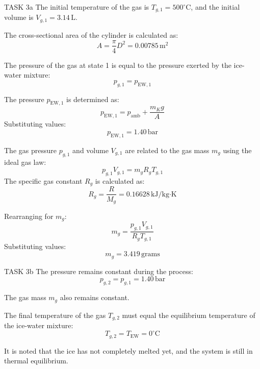 TASK 3a  
The initial temperature of the gas is \( T_{g,1} = 500^\circ\text{C} \), and the initial volume is \( V_{g,1} = 3.14 \, \text{L} \).  

The cross-sectional area of the cylinder is calculated as:  
\[
A = \frac{\pi}{4} D^2 = 0.00785 \, \text{m}^2
\]  

The pressure of the gas at state 1 is equal to the pressure exerted by the ice-water mixture:  
\[
p_{g,1} = p_{\text{EW},1}
\]  

The pressure \( p_{\text{EW},1} \) is determined as:  
\[
p_{\text{EW},1} = p_{\text{amb}} + \frac{m_K g}{A}
\]  
Substituting values:  
\[
p_{\text{EW},1} = 1.40 \, \text{bar}
\]  

The gas pressure \( p_{g,1} \) and volume \( V_{g,1} \) are related to the gas mass \( m_g \) using the ideal gas law:  
\[
p_{g,1} V_{g,1} = m_g R_g T_{g,1}
\]  
The specific gas constant \( R_g \) is calculated as:  
\[
R_g = \frac{R}{M_g} = 0.16628 \, \text{kJ/kg·K}
\]  

Rearranging for \( m_g \):  
\[
m_g = \frac{p_{g,1} V_{g,1}}{R_g T_{g,1}}
\]  
Substituting values:  
\[
m_g = 3.419 \, \text{grams}
\]  

TASK 3b  
The pressure remains constant during the process:  
\[
p_{g,2} = p_{g,1} = 1.40 \, \text{bar}
\]  

The gas mass \( m_g \) also remains constant.  

The final temperature of the gas \( T_{g,2} \) must equal the equilibrium temperature of the ice-water mixture:  
\[
T_{g,2} = T_{\text{EW}} = 0^\circ\text{C}
\]  

It is noted that the ice has not completely melted yet, and the system is still in thermal equilibrium.